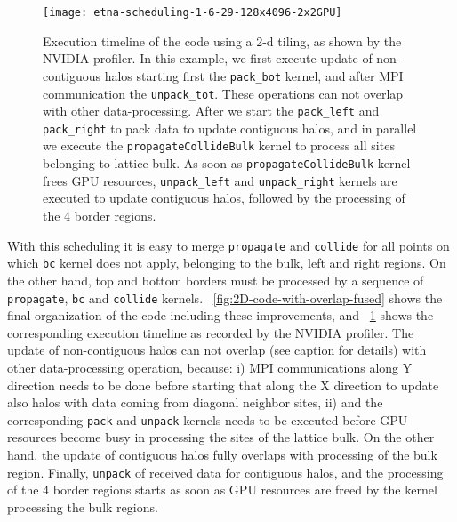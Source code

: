 \documentclass{elsarticle}
\begin{document}
%
\begin{figure}
%
\texttt{[image: etna-scheduling-1-6-29-128x4096-2x2GPU]}
%
\caption{\label{2D-code-scheduling} 
Execution timeline of the code using a 2-d tiling, as shown by the NVIDIA profiler. 
In this example, we first execute update of non-contiguous halos starting  
first the {\tt pack\_bot} kernel, and after MPI communication the {\tt unpack\_tot}. 
These operations can not overlap with other data-processing. After we start 
the {\tt pack\_left} and  {\tt pack\_right} to pack data to update contiguous 
halos, and in parallel we execute the {\tt propagateCollideBulk} kernel to 
process all sites belonging to lattice bulk. As soon as {\tt propagateCollideBulk} kernel 
frees GPU resources, {\tt unpack\_left} and {\tt unpack\_right} kernels 
are executed to update contiguous halos, followed by the processing of 
the 4 border regions.
}
\end{figure}


With this scheduling it is easy to merge {\tt propagate} and {\tt collide}
for all points on which {\tt bc} kernel does not apply, belonging to the bulk, 
left and right regions. 
%
On the other hand, top and bottom borders must be processed by a sequence 
of {\tt propagate}, {\tt bc} and {\tt collide} kernels. 
%
\figurename~\ref{fig:2D-code-with-overlap-fused} shows the final organization 
of the code including these improvements, and \figurename~\ref{2D-code-scheduling} 
shows the corresponding execution timeline as recorded by the NVIDIA profiler.
%
The update of non-contiguous halos can not overlap (see caption for details) 
with other data-processing operation, because: 
%
i) MPI communications along Y direction needs to be done before starting 
that along the X direction to update also halos with data coming from 
diagonal neighbor sites, 
%
ii) and the corresponding {\tt pack} and {\tt unpack} kernels needs to be 
executed before GPU resources become busy in processing the sites of the lattice bulk.   
%
On the other hand, the update of contiguous halos fully overlaps with 
processing of the bulk region. 
%
Finally, {\tt unpack} of received data for contiguous halos, and the processing 
of the 4 border regions starts as soon as GPU resources are freed by the kernel 
processing the bulk regions.
\end{document}
